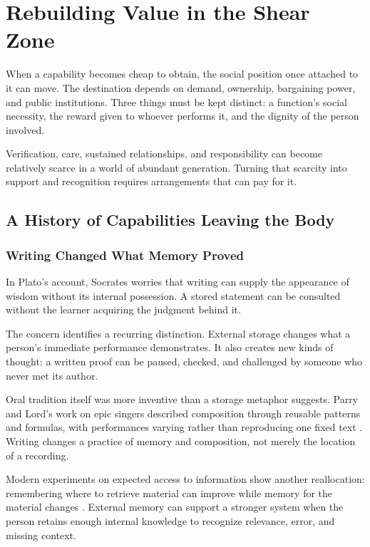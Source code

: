 \chapter{Rebuilding Value in the Shear Zone}

When a capability becomes cheap to obtain, the social position once attached to it can move. The destination depends on demand, ownership, bargaining power, and public institutions. Three things must be kept distinct: a function's social necessity, the reward given to whoever performs it, and the dignity of the person involved.

Verification, care, sustained relationships, and responsibility can become relatively scarce in a world of abundant generation. Turning that scarcity into support and recognition requires arrangements that can pay for it.

\section{A History of Capabilities Leaving the Body}

\subsection{Writing Changed What Memory Proved}

In Plato's account, Socrates worries that writing can supply the appearance of wisdom without its internal possession. A stored statement can be consulted without the learner acquiring the judgment behind it.

The concern identifies a recurring distinction. External storage changes what a person's immediate performance demonstrates. It also creates new kinds of thought: a written proof can be paused, checked, and challenged by someone who never met its author.

Oral tradition itself was more inventive than a storage metaphor suggests. Parry and Lord's work on epic singers described composition through reusable patterns and formulas, with performances varying rather than reproducing one fixed text \cite{parry1971making,parry1960singer}. Writing changes a practice of memory and composition, not merely the location of a recording.

Modern experiments on expected access to information show another reallocation: remembering where to retrieve material can improve while memory for the material changes \cite{sparrow2011google}. External memory can support a stronger system when the person retains enough internal knowledge to recognize relevance, error, and missing context.

